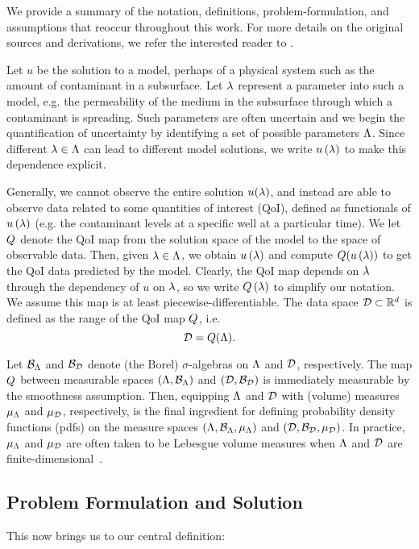 We provide a summary of the notation, definitions, problem-formulation, and assumptions that reoccur throughout this work. 
For more details on the original sources and derivations,  we refer the interested reader to \cite{BES12, BE13, BET+14}. 

Let $u$ be the solution to a model, perhaps of a physical system such as the amount of contaminant in a subsurface. 
Let $\lambda$ represent a parameter into such a model, e.g. the permeability of the medium in the subsurface through which a contaminant is spreading.
Such parameters are often uncertain and we begin the quantification of uncertainty by identifying a set of possible parameters ${\Lambda}$.
Since different $\lambda \in {\Lambda}$ can lead to different model solutions, we write $u\left ( \lambda \right )$ to make this dependence explicit.

Generally, we cannot observe the entire solution $u(\lambda)$, and instead are able to observe data related to some quantities of interest (QoI), defined as functionals of $u\left ( \lambda \right )$ (e.g. the contaminant levels at a specific well at a particular time).
We let $Q$ denote the QoI map from the solution space of the model to the space of observable data. 
Then, given $\lambda \in {\Lambda}$, we obtain $u\left ( \lambda \right )$ and compute $Q(u\left ( \lambda \right ))$ to get the QoI data predicted by the model.
Clearly, the QoI map depends on $\lambda$ through the dependency of $u$ on $\lambda$, so we write $Q\left ( \lambda \right )$ to simplify our notation.
We assume this map is at least piecewise-differentiable.	
The data space $\mathcal{D} \subset \mathbb{R}^d$ is defined as the range of the QoI map $Q$, i.e. 
\[
\mathcal{D} = Q({\Lambda}).
\]

Let $\mathcal{B}_{{\Lambda}}$ and $\mathcal{B}_{\mathcal{D}}$ denote (the Borel) $\sigma$-algebras on ${\Lambda}$ and $\mathcal{D}$, respectively.
The map $Q$ between measurable spaces $({\Lambda}, \mathcal{B}_{{\Lambda}})$ and $(\mathcal{D}, \mathcal{B}_{\mathcal{D}})$ is immediately measurable by the smoothness assumption. 
Then, equipping ${\Lambda}$ and $\mathcal{D}$ with (volume) measures $\mu_{{\Lambda}}$ and $\mu_{\mathcal{D}}$, respectively, is the final ingredient for defining probability density functions (pdfs) on the measure spaces $({\Lambda}, \mathcal{B}_{{\Lambda}}, \mu_{{\Lambda}})$ and $(\mathcal{D}, \mathcal{B}_{\mathcal{D}}, \mu_{\mathcal{D}})$.
In practice, $\mu_{{\Lambda}}$ and $\mu_{\mathcal{D}}$ are often taken to be Lebesgue volume measures when ${\Lambda}$ and $\mathcal{D}$ are finite-dimensional~\cite{BET+14, BJW18}.

\subsection{Problem Formulation and Solution}
This now brings us to our central definition:

